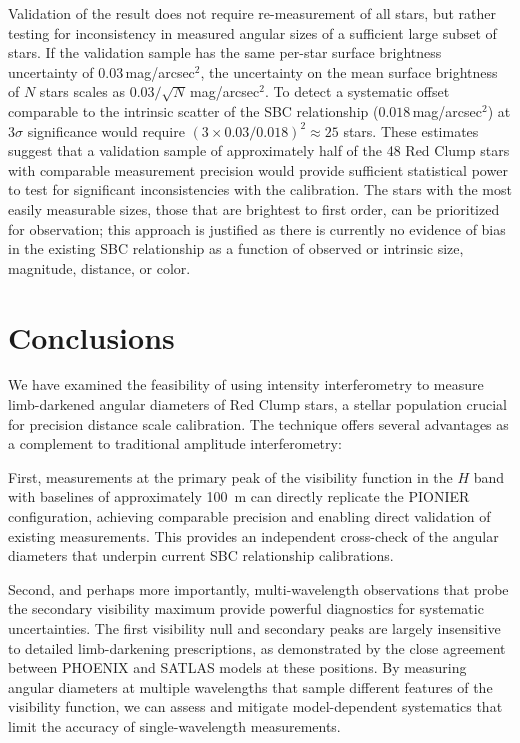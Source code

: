 \documentclass[linenumbers,trackchanges]{aastex701}
\begin{document}
Validation
of the \citet{2019Natur.567..200P} result does not require re-measurement of
all stars, but rather testing for inconsistency in measured angular sizes of a sufficient large subset of stars.
If the validation sample has the same per-star surface brightness uncertainty of $0.03$\,mag/arcsec$^2$, the uncertainty on the mean surface brightness of $N$ stars scales as $0.03/\sqrt{N}$\,mag/arcsec$^2$. To detect a systematic offset comparable to the intrinsic scatter of the SBC relationship ($0.018$\,mag/arcsec$^2$) at $3\sigma$ significance would require $(3 \times 0.03/0.018)^2 \approx 25$ stars. These estimates suggest that a validation sample of approximately half of the 48 Red Clump stars with comparable measurement precision would provide sufficient statistical power to test for significant inconsistencies with the \citet{2019Natur.567..200P} calibration.
The stars with the most easily measurable sizes, those that are brightest to first order, can be prioritized for observation; this approach is justified as there is currently no evidence of bias in the existing SBC relationship as a function of observed or intrinsic size, magnitude, distance, or color.




\section{Conclusions}

We have examined the feasibility of using intensity interferometry to measure limb-darkened angular diameters of Red Clump stars, a stellar population crucial for precision distance scale calibration. The technique offers several advantages as a complement to traditional amplitude interferometry:

First, measurements at the primary peak of the visibility function in the $H$ band with baselines of approximately 100~m can directly replicate the PIONIER configuration, achieving comparable precision and enabling direct validation of existing measurements. This provides an independent cross-check of the angular diameters that underpin current SBC relationship calibrations.

Second, and perhaps more importantly, multi-wavelength observations that probe the secondary visibility maximum provide powerful diagnostics for systematic uncertainties. The first visibility null and secondary peaks are largely insensitive to detailed limb-darkening prescriptions, as demonstrated by the close agreement between PHOENIX and SATLAS models at these positions. By measuring angular diameters at multiple wavelengths that sample different features of the visibility function, we can assess and mitigate model-dependent systematics that limit the accuracy of single-wavelength measurements.
\end{document}
